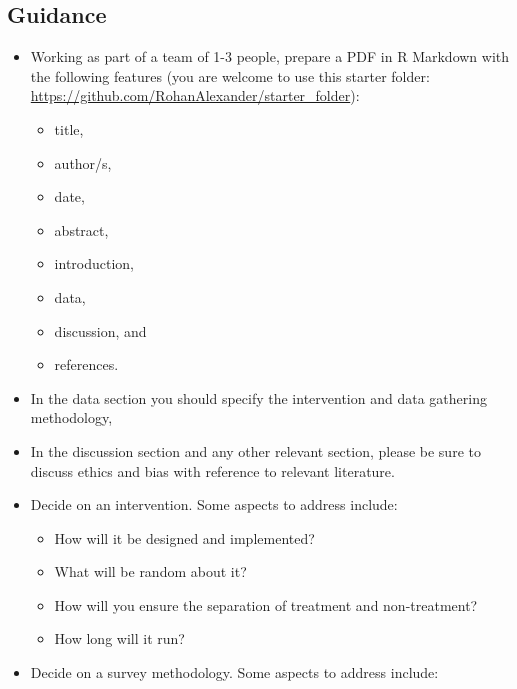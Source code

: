 \documentclass[
]{book}
\providecommand{\tightlist}{%
  \setlength{\itemsep}{0pt}\setlength{\parskip}{0pt}}
\begin{document}
\hypertarget{guidance-1}{%
\subsection{Guidance}\label{guidance-1}}

\begin{itemize}
\tightlist
\item
  Working as part of a team of 1-3 people, prepare a PDF in R Markdown with the following features (you are welcome to use this starter folder: \url{https://github.com/RohanAlexander/starter_folder}):

  \begin{itemize}
  \tightlist
  \item
    title,
  \item
    author/s,
  \item
    date,
  \item
    abstract,
  \item
    introduction,
  \item
    data,
  \item
    discussion, and
  \item
    references.
  \end{itemize}
\item
  In the data section you should specify the intervention and data gathering methodology,
\item
  In the discussion section and any other relevant section, please be sure to discuss ethics and bias with reference to relevant literature.
\item
  Decide on an intervention. Some aspects to address include:

  \begin{itemize}
  \tightlist
  \item
    How will it be designed and implemented?
  \item
    What will be random about it?
  \item
    How will you ensure the separation of treatment and non-treatment?
  \item
    How long will it run?
  \end{itemize}
\item
  Decide on a survey methodology. Some aspects to address include:


\end{itemize}
\end{document}
